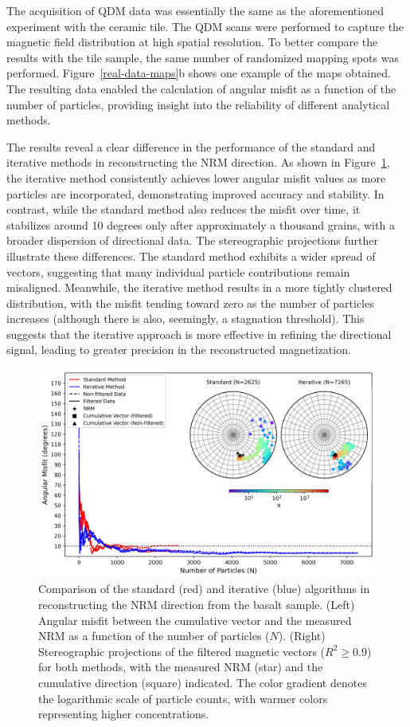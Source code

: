 The acquisition of QDM data was essentially the same as the aforementioned experiment with the ceramic tile. The QDM scans were performed to capture the magnetic field distribution at high spatial resolution. To better compare the results with the tile sample, the same number of randomized mapping spots was performed. Figure~\ref{real-data-maps}b shows one example of the maps obtained. The resulting data enabled the calculation of angular misfit as a function of the number of particles, providing insight into the reliability of different analytical methods.

The results reveal a clear difference in the performance of the standard and iterative methods in reconstructing the NRM direction. As shown in Figure~\ref{basalt-data-stereograms}, the iterative method consistently achieves lower angular misfit values as more particles are incorporated, demonstrating improved accuracy and stability. In contrast, while the standard method also reduces the misfit over time, it stabilizes around 10 degrees only after approximately a thousand grains, with a broader dispersion of directional data. The stereographic projections further illustrate these differences. The standard method exhibits a wider spread of vectors, suggesting that many individual particle contributions remain misaligned. Meanwhile, the iterative method results in a more tightly clustered distribution, with the misfit tending toward zero as the number of particles increases (although there is also, seemingly, a stagnation threshold). This suggests that the iterative approach is more effective in refining the directional signal, leading to greater precision in the reconstructed magnetization. 

\begin{figure}[tb!]
  \centering
  \includegraphics[width=1\linewidth]{paper/figures/basalt-data-stereoplot.png}
  \caption{
  Comparison of the standard (red) and iterative (blue) algorithms in reconstructing the NRM direction from the basalt sample. (Left) Angular misfit between the cumulative vector and the measured NRM as a function of the number of particles ($N$). (Right) Stereographic projections of the filtered magnetic vectors ($R^2 \geq 0.9$) for both methods, with the measured NRM (star) and the cumulative direction (square) indicated. The color gradient denotes the logarithmic scale of particle counts, with warmer colors representing higher concentrations.
  }
  \label{basalt-data-stereograms}
\end{figure}


